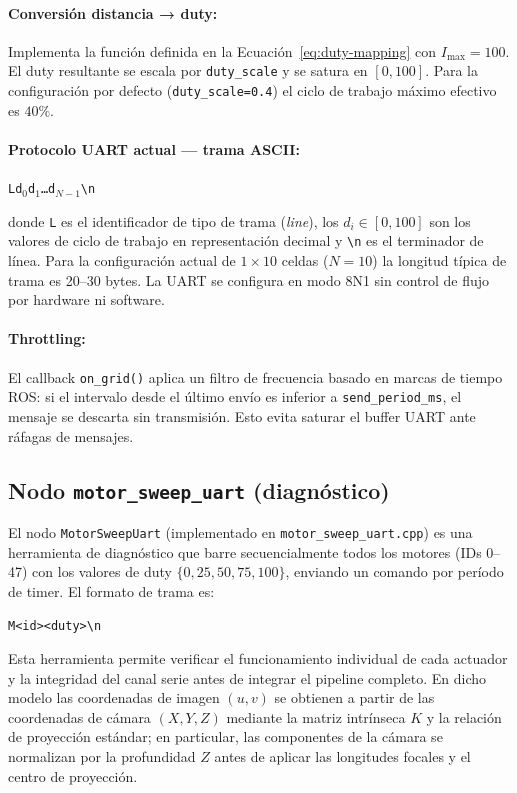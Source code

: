 \paragraph{Conversión distancia → duty:}
Implementa la función definida en la Ecuación~\eqref{eq:duty-mapping} con $I_{\max}=100$. El duty resultante se escala por \texttt{duty\_scale} y se satura en $[0,100]$. Para la configuración por defecto (\texttt{duty\_scale=0.4}) el ciclo de trabajo máximo efectivo es $40\%$.

\paragraph{Protocolo UART actual — trama ASCII:}
\begin{center}
  \texttt{L\textvisiblespace d$_0$\textvisiblespace d$_1$\textvisiblespace\ldots\textvisiblespace d$_{N-1}$\textbackslash n}
\end{center}
donde \texttt{L} es el identificador de tipo de trama (\emph{line}), los $d_i \in [0,100]$ son los valores de ciclo de trabajo en representación decimal y \texttt{\textbackslash n} es el terminador de línea. Para la configuración actual de $1\times10$ celdas ($N=10$) la longitud típica de trama es 20–30 bytes. La UART se configura en modo 8N1 sin control de flujo por hardware ni software.

\paragraph{Throttling:}
El callback \texttt{on\_grid()} aplica un filtro de frecuencia basado en marcas de tiempo ROS: si el intervalo desde el último envío es inferior a \texttt{send\_period\_ms}, el mensaje se descarta sin transmisión. Esto evita saturar el buffer UART ante ráfagas de mensajes.

\subsection{Nodo \texttt{motor\_sweep\_uart} (diagnóstico)}

El nodo \texttt{MotorSweepUart} (implementado en \texttt{motor\_sweep\_uart.cpp}) es una herramienta de diagnóstico que barre secuencialmente todos los motores (IDs 0–47) con los valores de duty $\{0, 25, 50, 75, 100\}$, enviando un comando por período de timer. El formato de trama es:
\begin{center}
  \texttt{M\textvisiblespace <id>\textvisiblespace <duty>\textbackslash n}
\end{center}
Esta herramienta permite verificar el funcionamiento individual de cada actuador y la integridad del canal serie antes de integrar el pipeline completo. En dicho modelo las coordenadas de imagen $(u,v)$ se obtienen a partir de las coordenadas de cámara $(X,Y,Z)$ mediante la matriz intrínseca $K$ y la relación de proyección estándar; en particular, las componentes de la cámara se normalizan por la profundidad $Z$ antes de aplicar las longitudes focales y el centro de proyección.

